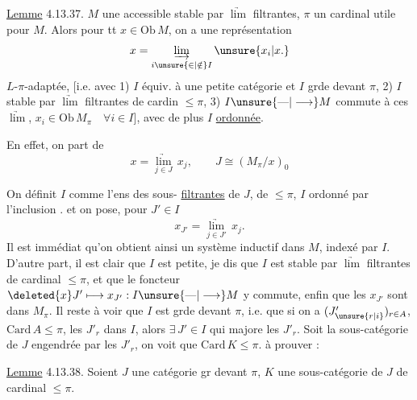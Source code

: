 \uline{Lemme} 4.13.37.  $M$ une 
accessible stable par $\underrightarrow{\lim}$ filtrantes, $\pi$ un cardinal utile pour $M$. Alors pour tt $x\in\mathrm{Ob}\,M$, on a une représentation
\[
x=\underset{i\unsure{\in|\notin} I}{\underrightarrow{\lim}}\,\unsure{x_i|x.}
\]
$L$-$\pi$-adaptée, [i.e. avec 1) $I$ équiv. à une petite catégorie et $I$ grde devant $\pi$, 2) $I$ stable par $\underrightarrow{\lim}$ filtrantes de cardin $\leq\pi$, 3) $I\unsure{\text{---}|\longrightarrow}M$ commute à ces $\underrightarrow{\lim}$,  $x_i\in\mathrm{Ob}\,M_\pi\quad\forall i\in I$], avec de plus $I$ \uline{ordonnée}.

En effet, on part de
\[
x=\underset{j\in J}{\underrightarrow{\lim}}\,x_j,\qquad
J\cong(M_\pi/x)_0
\]

 On définit $I$ comme l'ens des sous- \uline{filtrantes}   de $J$, de   $\leq\pi$,  $I$ ordonné par l'inclusion .  et on pose, pour $J'\in I$
\[
x_{J'}=\underset{j\in J'}{\underrightarrow{\lim}}\,x_j.
\]
Il est immédiat qu'on obtient ainsi un système inductif dans $M$, indexé par $I$.
D'autre part, il est clair que $I$ est petite, je dis que $I$ est stable par $\underrightarrow{\lim}$ filtrantes de cardinal $\leq\pi$, et que le foncteur $\deleted{x}J'\longmapsto x_{J'}:I\unsure{\text{---}|\longrightarrow}M$ y commute, enfin que les $x_{J'}$ sont dans $M_\pi$. Il reste à voir que $I$ est grde devant $\pi$, i.e. que  si on a $(J'_{\unsure{r|i}})_{r\in A}$,  $\mathrm{Card}\,A\leq\pi$, les $J'_r$ dans $I$, alors $\exists\,J'\in I$ qui majore les $J'_r$. Soit    la sous-catégorie  de $J$ engendrée par les $J'_r$, on voit    que $\mathrm{Card}\,K\leq\pi$.  à prouver :

\uline{Lemme} 4.13.38. Soient $J$ une catégorie gr devant $\pi$, $K$ une sous-catégorie de $J$  de cardinal $\leq\pi$.

